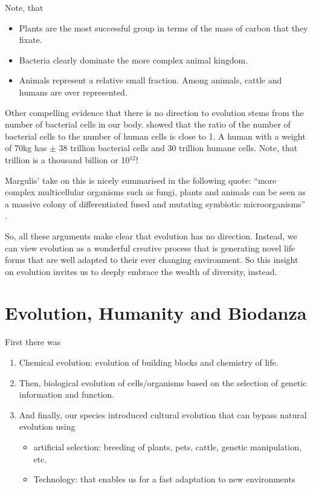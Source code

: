 \documentclass[
  11pt,
]{book}
\providecommand{\tightlist}{%
  \setlength{\itemsep}{0pt}\setlength{\parskip}{0pt}}
\begin{document}
Note, that

\begin{itemize}
\item
  Plants are the most successful group in terms of the mass of carbon that they fixate.
\item
  Bacteria clearly dominate the more complex animal kingdom.
\item
  Animals represent a relative small fraction. Among animals, cattle and humans are over represented.
\end{itemize}

Other compelling evidence that there is no direction to evolution stems from the number of bacterial cells in our body. \citet{Sender2016} showed that the ratio of the number of bacterial cells to the number of human cells is close to 1. A human with a weight of 70kg has \(\pm\) 38 trillion bacterial cells and 30 trillion humane cells. Note, that trillion is a thousand billion or 10\(^{12}\)!

Margulis' take on this is nicely summarised in the following quote: ``more complex multicellular organisms such as fungi, plants and animals can be seen as a massive colony of differentiated fused and mutating symbiotic microorganisms'' \citep{margulis1999}.

So, all these arguments make clear that evolution has no direction.
Instead, we can view evolution as a wonderful creative process that is generating novel life forms that are well adapted to their ever changing environment. So this insight on evolution invites us to deeply embrace the wealth of diversity, instead.

\hypertarget{evolution-humanity-and-biodanza}{%
\section{Evolution, Humanity and Biodanza}\label{evolution-humanity-and-biodanza}}

First there was

\begin{enumerate}
\def\labelenumi{\arabic{enumi}.}
\item
  Chemical evolution: evolution of building blocks and chemistry of life.
\item
  Then, biological evolution of cells/organisms based on the selection of genetic information and function.
\item
  And finally, our species introduced cultural evolution that can bypass natural evolution using

  \begin{itemize}
  \tightlist
  \item
    artificial selection: breeding of plants, pets, cattle, genetic manipulation, etc.
  \item
    Technology: that enables us for a fast adaptation to new environments
  \end{itemize}
\end{enumerate}
\end{document}

